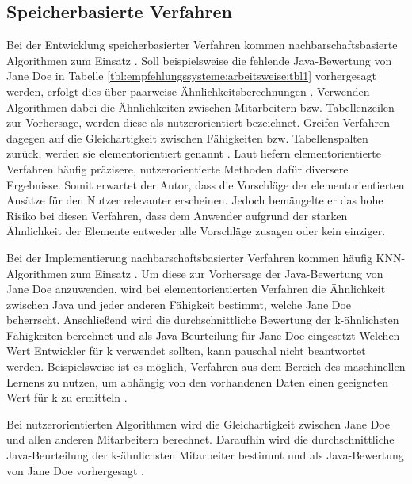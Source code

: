 \subsection{Speicherbasierte Verfahren}
\label{ch:empfehlungssysteme:cf:speicherbasiert}
Bei der Entwicklung speicherbasierter Verfahren kommen nachbarschaftsbasierte Algorithmen zum Einsatz \cite[S. 29]{recommenderSystems:2016}. Soll beispielsweise die fehlende Java-Bewertung von Jane Doe in Tabelle \ref{tbl:empfehlungssysteme:arbeitsweise:tbl1} vorhergesagt werden, erfolgt dies über paarweise Ähnlichkeitsberechnungen \cite[S. 2f.]{bharti:2019}. Verwenden Algorithmen dabei die Ähnlichkeiten zwischen Mitarbeitern bzw. Tabellenzeilen zur Vorhersage, werden diese als nutzerorientiert bezeichnet. Greifen Verfahren dagegen auf die Gleichartigkeit zwischen Fähigkeiten bzw. Tabellenspalten zurück, werden sie elementorientiert genannt \cite[S. 1f.]{duong:2018}. Laut \textcite[S. 42]{recommenderSystems:2016} liefern elementorientierte Verfahren häufig präzisere, nutzerorientierte Methoden dafür diversere Ergebnisse. Somit erwartet der Autor, dass die Vorschläge der elementorientierten Ansätze für den Nutzer relevanter erscheinen. Jedoch bemängelte er das hohe Risiko bei diesen Verfahren, dass dem Anwender aufgrund der starken Ähnlichkeit der Elemente entweder alle Vorschläge zusagen oder kein einziger.

Bei der Implementierung nachbarschaftsbasierter Verfahren kommen häufig \ac{KNN}-Algorithmen zum Einsatz \cite[S. 1]{nayak:2018}. Um diese zur Vorhersage der Java-Bewertung von Jane Doe anzuwenden, wird bei elementorientierten Verfahren die Ähnlichkeit zwischen Java und jeder anderen Fähigkeit bestimmt, welche Jane Doe beherrscht. Anschließend wird die durchschnittliche Bewertung der k-ähnlichsten Fähigkeiten berechnet und als Java-Beurteilung für Jane Doe eingesetzt \cite[S. 2]{hao:2013} Welchen Wert Entwickler für k verwendet sollten, kann pauschal nicht beantwortet werden. Beispielsweise ist es möglich, Verfahren aus dem Bereich des maschinellen Lernens zu nutzen, um abhängig von den vorhandenen Daten einen geeigneten Wert für k zu ermitteln \cite[S. 2f.]{jiang:2007}.

Bei nutzerorientierten Algorithmen wird die Gleichartigkeit zwischen Jane Doe und allen anderen Mitarbeitern berechnet. Daraufhin wird die durchschnittliche Java-Beurteilung der k-ähnlichsten Mitarbeiter bestimmt und als Java-Bewertung von Jane Doe vorhergesagt \cite[S. 2f.]{hao:2013}.

